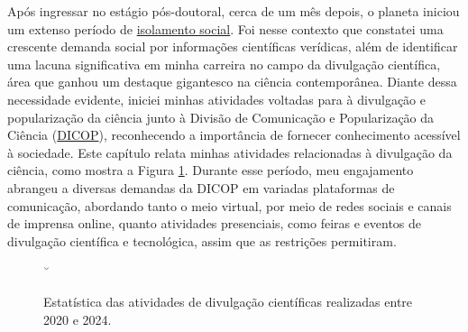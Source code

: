 \documentclass[10pt,a4paper,oneside]{book}
\begin{document}
Após ingressar no estágio pós-doutoral, cerca de um mês depois, o planeta iniciou um extenso período de \href{http://repositoriocovid19.unb.br/repositorio-produtos/desvelando-o-isolamento-social-no-cotidiano-vivido-na-pandemia-da-covid-19/}{isolamento social}. Foi nesse contexto que constatei uma crescente demanda social por informações científicas verídicas, além de identificar uma lacuna significativa em minha carreira no campo da divulgação científica, área que ganhou um destaque gigantesco na ciência contemporânea. Diante dessa necessidade evidente, iniciei minhas atividades voltadas para à divulgação e popularização da ciência junto à Divisão de Comunicação e Popularização da Ciência (\href{https://www.gov.br/observatorio/pt-br/assuntos/areas-de-atuacao/divulgacao-e-popularizacao-da-ciencia}{DICOP}), reconhecendo a importância de fornecer conhecimento acessível à sociedade. Este capítulo relata minhas atividades relacionadas à divulgação da ciência, como mostra a Figura \ref{fig_resumo_divulgacao}. Durante esse período, meu engajamento abrangeu a diversas demandas da DICOP em variadas plataformas de comunicação, abordando tanto o meio virtual, por meio de redes sociais e canais de imprensa online, quanto atividades presenciais, como feiras e eventos de divulgação científica e tecnológica, assim que as restrições permitiram.

\begin{figure}
	\centering
	\caption{Estatística das atividades de divulgação científicas realizadas entre 2020 e 2024.}
	\label{fig_resumo_divulgacao}˘
\end{figure}
\end{document}
